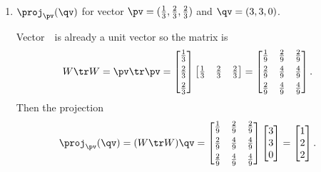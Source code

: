 \begin{example}
\begin{enumerate}
\item \(\proj_\pv(\qv)\) for vector \(\pv=(\tfrac13,\tfrac23,\tfrac23)\) and \(\qv=(3,3,0)\).
\begin{solution} 
Vector~\pv\ is already a unit vector so the matrix is
\begin{equation*}
W\tr W=\pv\tr\pv=\begin{bmatrix} \tfrac13\\[1ex]\tfrac23\\[1ex]\tfrac23 \end{bmatrix}
\begin{bmatrix} \tfrac13&\tfrac23&\tfrac23 \end{bmatrix}
=\begin{bmatrix} \tfrac19&\tfrac29&\tfrac29\\[1ex]
\tfrac29&\tfrac49&\tfrac49\\[1ex]
\tfrac29&\tfrac49&\tfrac49 \end{bmatrix}.
\end{equation*}
Then the projection
\begin{equation*}
\proj_\pv(\qv)=(W\tr W)\qv
=\begin{bmatrix} \tfrac19&\tfrac29&\tfrac29\\[1ex]
\tfrac29&\tfrac49&\tfrac49\\[1ex]
\tfrac29&\tfrac49&\tfrac49 \end{bmatrix}
\begin{bmatrix} 3\\3\\0 \end{bmatrix}
=\begin{bmatrix} 1\\2\\2 \end{bmatrix}.
\end{equation*}
\end{solution}
\end{enumerate}
\end{example}



